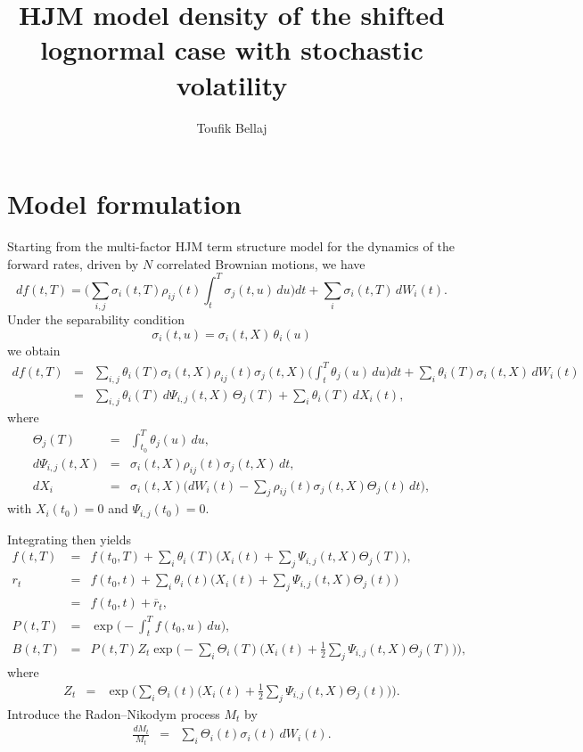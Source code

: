 \documentclass[12pt,a4paper,final]{article}
\author{Toufik Bellaj}
\title{HJM model density of the shifted lognormal case with stochastic volatility}
\date{}
\theoremstyle{plain}
\begin{document}
\maketitle

\section{Model formulation}
Starting from the multi-factor HJM term structure model for the dynamics of the
forward rates, driven by $N$ correlated Brownian motions, we have
\begin{equation}
df(t,T)
=\Biggl(\sum_{i,j}\sigma_i(t,T)\rho_{ij}(t)\int_{t}^{T}\sigma_j(t,u)\,du\Biggr)dt
+\sum_i \sigma_i(t,T)\,dW_i(t).
\end{equation}
Under the separability condition
\begin{equation}
\sigma_i(t,u)=\sigma_i(t,X)\,\theta_i(u)
\end{equation}
we obtain
\begin{eqnarray*}
df(t,T)
&=&\sum_{i,j}\theta_i(T)\sigma_i(t,X)\rho_{ij}(t)\sigma_j(t,X)
\Biggl(\int_{t}^{T}\theta_j(u)\,du\Biggr)dt
+\sum_i\theta_i(T)\sigma_i(t,X)\,dW_i(t)\\
&=&\sum_{i,j}\theta_i(T)\,d\Psi_{i,j}(t,X)\,\Theta_j(T)
+\sum_i\theta_i(T)\,dX_i(t),
\end{eqnarray*}
where
\begin{eqnarray}
\Theta_j(T)&=&\int_{t_0}^{T}\theta_j(u)\,du,\\
d\Psi_{i,j}(t,X)&=&\sigma_i(t,X)\rho_{ij}(t)\sigma_j(t,X)\,dt,\\
dX_i&=&\sigma_i(t,X)
\Biggl(dW_i(t)-\sum_j\rho_{ij}(t)\sigma_j(t,X)\Theta_j(t)\,dt\Biggr),
\end{eqnarray}
with $X_i(t_0)=0$ and $\Psi_{i,j}(t_0)=0$.

Integrating then yields
\begin{eqnarray*}
f(t,T)
&=& f(t_0,T)
+\sum_{i}\theta_i(T)
\Biggl(X_i(t)+\sum_{j}\Psi_{i,j}(t,X)\Theta_j(T)\Biggr),\\
r_t
&=& f(t_0,t)
+\sum_{i}\theta_i(t)
\Biggl(X_i(t)+\sum_{j}\Psi_{i,j}(t,X)\Theta_j(t)\Biggr)\\
&=& f(t_0,t)+\overline{r}_t,\\
P(t,T)
&=&\exp\Biggl(-\int_{t}^{T}f(t_0,u)\,du\Biggr),\\
B(t,T)
&=&P(t,T)Z_t\exp\Biggl(
-\sum_{i}\Theta_i(T)
\Biggl(X_i(t)+\frac12\sum_{j}\Psi_{i,j}(t,X)\Theta_j(T)\Biggr)
\Biggr),
\end{eqnarray*}
where
\begin{eqnarray*}
Z_t
&=&\exp\Biggl(
\sum_{i}\Theta_i(t)
\Biggl(X_i(t)+\frac12\sum_{j}\Psi_{i,j}(t,X)\Theta_j(t)\Biggr)
\Biggr).
\end{eqnarray*}
Introduce the Radon--Nikodym process $M_t$ by
\begin{eqnarray}
\frac{dM_t}{M_t}&=&\sum_i\Theta_i(t)\sigma_i(t)\,dW_i(t).
\end{eqnarray}
\end{document}
